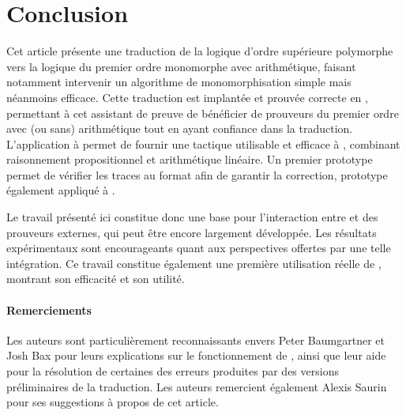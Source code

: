 \section{Conclusion}

Cet article présente une traduction de la logique d'ordre supérieure
polymorphe vers la logique du premier ordre monomorphe avec
arithmétique, faisant notamment intervenir un algorithme de
monomorphisation simple mais néanmoins efficace. Cette traduction est
implantée et prouvée correcte en \holfour, permettant à cet assistant de
preuve de bénéficier de prouveurs du premier ordre avec (ou sans)
arithmétique tout en ayant confiance dans la traduction. L'application à
\beagle permet de fournir une tactique utilisable et efficace à
\holfour, combinant raisonnement propositionnel et arithmétique
linéaire. Un premier prototype permet de vérifier les traces au format
\tff afin de garantir la correction, prototype également appliqué à
\beagle.

Le travail présenté ici constitue donc une base pour l'interaction entre
\holfour et des prouveurs externes, qui peut être encore largement
développée. Les résultats expérimentaux sont encourageants quant aux
perspectives offertes par une telle intégration. Ce travail constitue
également une première utilisation réelle de \beagle, montrant son
efficacité et son utilité.


\paragraph{Remerciements}

Les auteurs sont particulièrement reconnaissants envers Peter
Baumgartner et Josh Bax pour leurs explications sur le fonctionnement de
\beagle, ainsi que leur aide pour la résolution de certaines des erreurs
produites par des versions préliminaires de la traduction. Les auteurs
remercient également Alexis Saurin pour ses suggestions à propos de
cet article.
